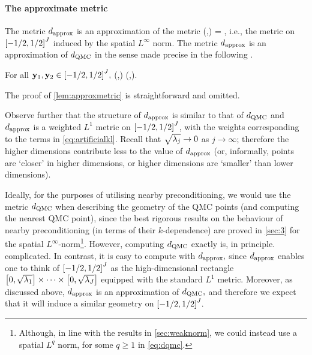 \paragraph{The approximate metric} The metric $d_{\mathrm{approx}}$ is an approximation of the metric
\beq\label{eq:dqmc}
\dQMC(\byo,\byt) = ,%
\eeq
i.e., the metric on $\cube{J}$ induced by the spatial $L^\infty$ norm. The metric $d_{\mathrm{approx}}$ is an approximation of $d_{\mathrm{QMC}}$ in the sense made precise in the following .

\label{lem:approxmetric}
For all $\byo,\byt \in \cube{J},$
\beqs
\dQMC\mleft(\byo,\byt\mright) \leq \dapprox\mleft(\byo,\byt\mright).
\eeqs
\ele

The proof of \cref{lem:approxmetric} is straightforward and omitted.

Observe further that the structure of $d_{\mathrm{approx}}$ is similar to that of $d_{\mathrm{QMC}}$ and $d_{\mathrm{approx}}$ is a weighted $L^1$ metric on $\cube{J}$, with the weights corresponding to the terms in \cref{eq:artificialkl}. Recall that $\sqrt{\lambda_{j}} \rightarrow 0$ as $j \rightarrow \infty$; therefore the higher dimensions contribute less to the value of $d_{\mathrm{approx}}$ (or, informally, points are `closer' in higher dimensions, or higher dimensions are `smaller' than lower dimensions).

Ideally, for the purposes of utilising nearby preconditioning, we would use the metric $d_{\mathrm{QMC}}$ when describing the geometry of the QMC points  (and computing the nearest QMC point), since the best rigorous results on the behaviour of nearby preconditioning (in terms of their $k$-dependence) are proved in \cref{sec:3} for the spatial $L^\infty$-norm\footnote{Although, in line with the results in \cref{sec:weaknorm}, we could instead use a spatial $L^q$ norm, for some $q \geq 1$ in \cref{eq:dqmc}.}. However, computing $d_{\mathrm{QMC}}$ exactly is, in principle. complicated. In contrast, it is easy to compute with $d_{\mathrm{approx}},$ since $d_{\mathrm{approx}}$ enables one to think of $\cube{J}$ as the high-dimensional rectangle $\mleft[0,\sqrt{\lambdao}\mright]\times\cdots\times\mleft[0,\sqrt{\lambdaJ}\mright]$ equipped with the standard $L^1$ metric. Moreover, as discussed above, $d_{\mathrm{approx}}$ is an approximation of $d_{\mathrm{QMC}},$ and therefore we expect that it will induce a similar geometry on $\cube{J}.$

